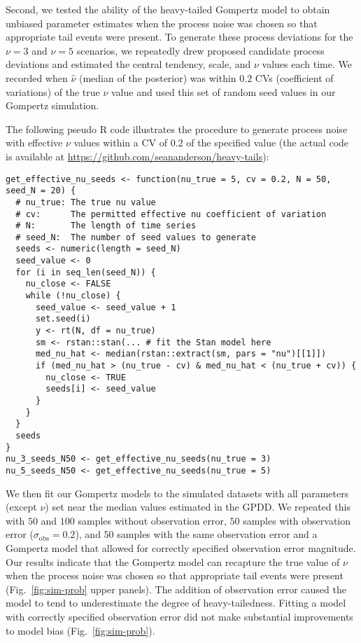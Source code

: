 \documentclass[12pt]{article}
\begin{document}
Second, we tested the ability of the heavy-tailed Gompertz model to obtain
unbiased parameter estimates when the process noise was chosen so that
appropriate tail events were present. To generate these process deviations for
the $\nu = 3$ and $\nu = 5$ scenarios, we repeatedly drew proposed candidate
process deviations and estimated the central tendency, scale, and $\nu$ values
each time. We recorded when $\hat{\nu}$ (median of the posterior) was within
$0.2$ CVs (coefficient of variations) of the true $\nu$ value and used this
set of random seed values in our Gompertz simulation.

The following pseudo R code illustrates the procedure to generate process
noise with effective $\nu$ values within a CV of 0.2 of the specified value
(the actual code is available at
\url{https://github.com/seananderson/heavy-tails}):

\clearpage

\begin{footnotesize}
\begin{verbatim}
get_effective_nu_seeds <- function(nu_true = 5, cv = 0.2, N = 50, seed_N = 20) {
  # nu_true: The true nu value
  # cv:      The permitted effective nu coefficient of variation
  # N:       The length of time series
  # seed_N:  The number of seed values to generate
  seeds <- numeric(length = seed_N)
  seed_value <- 0
  for (i in seq_len(seed_N)) {
    nu_close <- FALSE
    while (!nu_close) {
      seed_value <- seed_value + 1
      set.seed(i)
      y <- rt(N, df = nu_true)
      sm <- rstan::stan(... # fit the Stan model here
      med_nu_hat <- median(rstan::extract(sm, pars = "nu")[[1]])
      if (med_nu_hat > (nu_true - cv) & med_nu_hat < (nu_true + cv)) {
        nu_close <- TRUE
        seeds[i] <- seed_value
      }
    }
  }
  seeds
}
nu_3_seeds_N50 <- get_effective_nu_seeds(nu_true = 3)
nu_5_seeds_N50 <- get_effective_nu_seeds(nu_true = 5)
\end{verbatim}
\end{footnotesize}

We then fit our Gompertz models to the simulated datasets with all parameters
(except $\nu$) set near the median values estimated in the GPDD. We repeated
this with $50$ and $100$ samples without observation error, $50$ samples with
observation error ($\sigma_\mathrm{obs} = 0.2$), and $50$ samples with the
same observation error and a Gompertz model that allowed for correctly
specified observation error magnitude. Our results indicate that the Gompertz
model can recapture the true value of $\nu$ when the process noise was chosen
so that appropriate tail events were present (Fig.~\ref{fig:sim-prob} upper panels).
The addition of observation error caused the
model to tend to underestimate the degree of heavy-tailedness. Fitting a model
with correctly specified observation error did not make substantial
improvements to model bias (Fig.~\ref{fig:sim-prob}).
\end{document}
